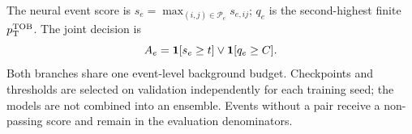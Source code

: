 The neural event score is $s_e=\max_{(i,j)\in\mathcal P_e}s_{e,ij}$;
$q_e$ is the second-highest finite $p_{\mathrm{T}}^{\mathrm{TOB}}$. The joint decision is
\begin{equation}
  A_e=\mathbf{1}[s_e\geq t]\vee\mathbf{1}[q_e\geq C].
  \label{eq:pair_decision}
\end{equation}
Both branches share one event-level background budget. Checkpoints and
thresholds are selected on validation independently for each training seed;
the models are not combined into an ensemble. Events without a pair receive
a non-passing score and remain in the evaluation denominators.
